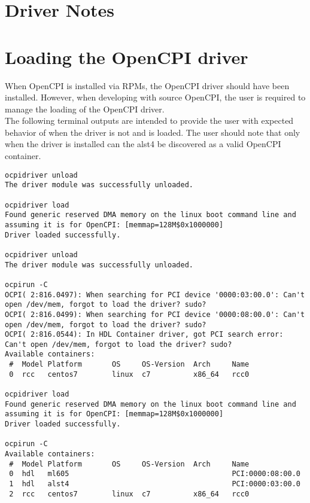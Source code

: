 \documentclass{article}
\begin{document}


\section{Driver Notes}


\section{Loading the OpenCPI driver}
When OpenCPI is installed via RPMs, the OpenCPI driver should have been installed. However, when developing with source OpenCPI, the user is required to manage the loading of the OpenCPI driver. \\
The following terminal outputs are intended to provide the user with expected behavior of when the driver is not and is loaded. The user should note that only when the driver is installed can the alst4 be discovered as a valid OpenCPI container.

\begin{lstlisting}
ocpidriver unload
The driver module was successfully unloaded.

ocpidriver load
Found generic reserved DMA memory on the linux boot command line and assuming it is for OpenCPI: [memmap=128M$0x1000000]
Driver loaded successfully.

ocpidriver unload
The driver module was successfully unloaded.

ocpirun -C
OCPI( 2:816.0497): When searching for PCI device '0000:03:00.0': Can't open /dev/mem, forgot to load the driver? sudo?
OCPI( 2:816.0499): When searching for PCI device '0000:08:00.0': Can't open /dev/mem, forgot to load the driver? sudo?
OCPI( 2:816.0544): In HDL Container driver, got PCI search error: Can't open /dev/mem, forgot to load the driver? sudo?
Available containers:
 #  Model Platform       OS     OS-Version  Arch     Name
 0  rcc   centos7        linux  c7          x86_64   rcc0

ocpidriver load
Found generic reserved DMA memory on the linux boot command line and assuming it is for OpenCPI: [memmap=128M$0x1000000]
Driver loaded successfully.

ocpirun -C
Available containers:
 #  Model Platform       OS     OS-Version  Arch     Name
 0  hdl   ml605                                      PCI:0000:08:00.0
 1  hdl   alst4                                      PCI:0000:03:00.0
 2  rcc   centos7        linux  c7          x86_64   rcc0
\end{lstlisting}
\end{document}
